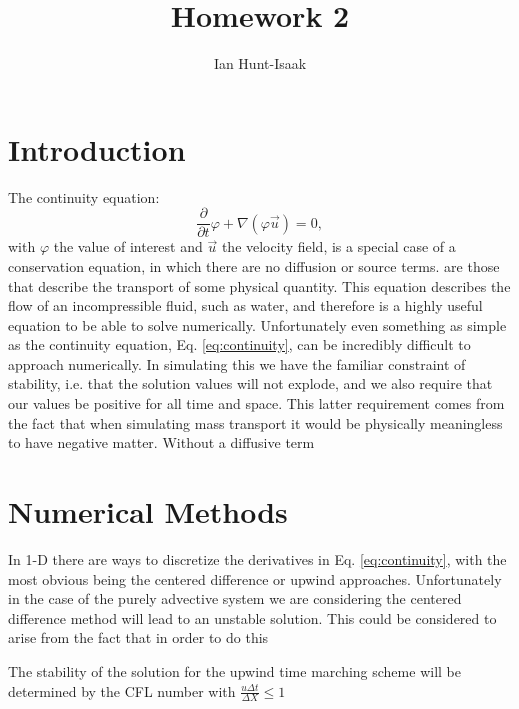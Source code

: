 \documentclass[]{article}
\title{Homework 2}
\author{Ian Hunt-Isaak}
\date{}
\begin{document}
\maketitle


\section{Introduction}
The continuity equation:
\begin{equation}
\frac{\partial}{\partial t} \varphi + \nabla(\varphi \vec{u}) = 0,
\label{eq:continuity}
\end{equation}
with $\varphi$ the value of interest and $\vec{u}$ the velocity field,  is a special case of a conservation equation, in which there are no diffusion or source terms. are those that describe the transport of some physical quantity. This equation describes the flow of an incompressible fluid, such as water, and therefore is a highly useful equation to be able to solve numerically. Unfortunately even something as simple as the continuity equation, Eq. \ref{eq:continuity}, can be incredibly difficult to approach numerically. In simulating this we have the familiar constraint of stability, i.e. that the solution values will not explode, and we also require that our values be positive for all time and space. This latter requirement comes from the fact that when simulating mass transport it would be physically meaningless to have negative matter. 
Without a diffusive term 




\section{Numerical Methods}
In 1-D there are ways to discretize the derivatives in Eq. \ref{eq:continuity}, with the most obvious being the centered difference or upwind approaches. Unfortunately in the case of the purely advective system we are considering the centered difference method will lead to an unstable solution. This could be considered to arise from the fact that in order to do this 

The stability of the solution for the upwind time marching scheme will be determined by the CFL number with $\frac{u \Delta t}{\Delta X}\leq 1$
\end{document}
